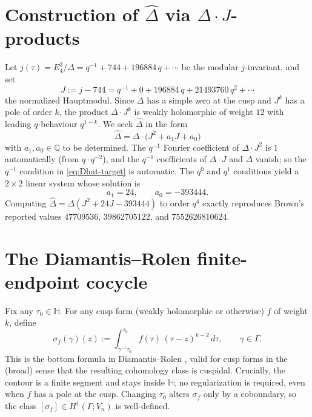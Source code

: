 \documentclass[11pt,letterpaper]{article}
\newcommand{\HH}{\mathbb{H}}
\newcommand{\QQ}{\mathbb{Q}}
\newcommand{\Dhat}{\widehat{\Delta}}
\begin{document}
\section{Construction of $\widehat{\Delta}$ via $\Delta\cdot J$-products}

Let $j(\tau) = E_4^3 / \Delta = q^{-1} + 744 + 196884\, q + \cdots$ be the modular $j$-invariant, and set
\[
  J := j - 744 = q^{-1} + 0 + 196884\, q + 21493760\, q^2 + \cdots
\]
the normalized Hauptmodul. Since $\Delta$ has a simple zero at the cusp and $J^k$ has a pole of order $k$, the product $\Delta \cdot J^k$ is weakly holomorphic of weight $12$ with leading $q$-behaviour $q^{1-k}$. We seek $\Dhat$ in the form
\begin{equation}\label{eq:Dhat-ansatz}
  \Dhat = \Delta \cdot \bigl(J^2 + a_1 J + a_0\bigr)
\end{equation}
with $a_1, a_0 \in \QQ$ to be determined. The $q^{-1}$ Fourier coefficient of $\Delta \cdot J^2$ is $1$ automatically (from $q \cdot q^{-2}$), and the $q^{-1}$ coefficients of $\Delta \cdot J$ and $\Delta$ vanish; so the $q^{-1}$ condition in \eqref{eq:Dhat-target} is automatic. The $q^0$ and $q^1$ conditions yield a $2 \times 2$ linear system whose solution is
\begin{equation}
  \boxed{\;a_1 = 24, \qquad a_0 = -393444.\;}
\end{equation}
Computing $\Dhat = \Delta(J^2 + 24 J - 393444)$ to order $q^4$ exactly reproduces Brown's reported values $47709536$, $39862705122$, and $7552626810624$.

\section{The Diamantis--Rolen finite-endpoint cocycle}

Fix any $\tau_0 \in \HH$. For any cusp form (weakly holomorphic or otherwise) $f$ of weight $k$, define
\begin{equation}\label{eq:DR-cocycle}
  \sigma_f(\gamma)(z) := \int_{\gamma^{-1}\tau_0}^{\tau_0} f(\tau)\,(\tau - z)^{k-2}\, d\tau, \qquad \gamma \in \Gamma.
\end{equation}
This is the bottom formula in Diamantis--Rolen \cite[\S 2.1]{DR2017}, valid for cusp forms in the (broad) sense that the resulting cohomology class is cuspidal. Crucially, the contour is a finite segment and stays inside $\HH$; no regularization is required, even when $f$ has a pole at the cusp. Changing $\tau_0$ alters $\sigma_f$ only by a coboundary, so the class $[\sigma_f] \in H^1(\Gamma; V_n)$ is well-defined.
\end{document}
